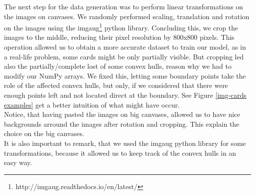 \documentclass[a4paper]{article}
\begin{document}
\newline \newline\newline 
\noindent The next step for the data generation was to perform linear transformations on the images on canvases.  We randomly performed scaling, translation and rotation on the images using the imgaug\footnote{http://imgaug.readthedocs.io/en/latest/} python library.  Concluding this, we crop the images to the middle, reducing their pixel resolution by 800x800 pixels.  This operation allowed us to obtain a more accurate dataset to train our model, as in a real-life problem, some cards might be only partially visible.  But cropping led also the partially/complete lost of some convex hulls, reason why we had to modify our NumPy arrays.  We fixed this, letting some boundary points take the role of the affected convex hulls, but only, if we considered that there were enough points left and not located direct at the boundary.  
See Figure \ref{img-cards examples} get a better intuition of what might have occur. \\ Notice, that having pasted the images on big canvases, allowed us to have nice backgrounds arround the images after rotation and cropping.  This explain the choice on the big canvases.\\
It is also important to remark, that we used the imgaug python library for some transformations, because it allowed us to keep track of the convex hulls in an easy way.
\end{document}

